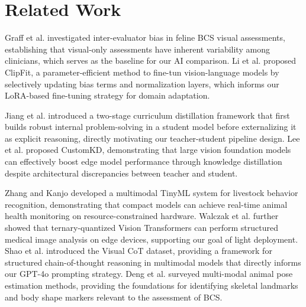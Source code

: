 \documentclass[11pt,twocolumn]{article}
\begin{document}
\section{Related Work}

Graff et al. \cite{graff2025} investigated inter-evaluator bias in feline BCS visual assessments, establishing that visual-only assessments have inherent variability among clinicians, which serves as the baseline for our AI comparison. Li et al. \cite{li2024clipfit} proposed ClipFit, a parameter-efficient method to fine-tun vision-language models by selectively updating bias terms and normalization layers, which informs our LoRA-based fine-tuning strategy for domain adaptation.

Jiang et al. \cite{jiang2025curriculum} introduced a two-stage curriculum distillation framework that first builds robust internal problem-solving in a student model before externalizing it as explicit reasoning, directly motivating our teacher-student pipeline design. Lee et al. \cite{lee2025customkd} proposed CustomKD, demonstrating that large vision foundation models can effectively boost edge model performance through knowledge distillation despite architectural discrepancies between teacher and student.

Zhang and Kanjo \cite{zhang2025tinyml} developed a multimodal TinyML system for livestock behavior recognition, demonstrating that compact models can achieve real-time animal health monitoring on resource-constrained hardware. Walczak et al. \cite{walczak2025bitmedvit} further showed that ternary-quantized Vision Transformers can perform structured medical image analysis on edge devices, supporting our goal of light deployment. Shao et al. \cite{shao2024visualcot} introduced the Visual CoT dataset, providing a framework for structured chain-of-thought reasoning in multimodal models that directly informs our GPT-4o prompting strategy. Deng et al. \cite{deng2024ape} surveyed multi-modal animal pose estimation methods, providing the foundations for identifying skeletal landmarks and body shape markers relevant to the assessment of BCS.
\end{document}
